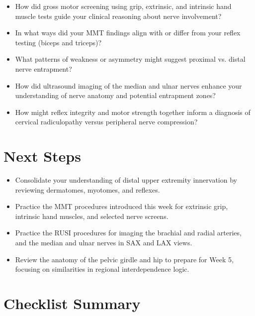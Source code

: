\begin{itemize}
  \item How did gross motor screening using grip, extrinsic, and intrinsic hand muscle tests guide your clinical reasoning about nerve involvement?
  \item In what ways did your MMT findings align with or differ from your reflex testing (biceps and triceps)?
  \item What patterns of weakness or asymmetry might suggest proximal vs. distal nerve entrapment?
  \item How did ultrasound imaging of the median and ulnar nerves enhance your understanding of nerve anatomy and potential entrapment zones?
  \item How might reflex integrity and motor strength together inform a diagnosis of cervical radiculopathy versus peripheral nerve compression?
\end{itemize}

\section*{Next Steps}

\begin{itemize}
  \item Consolidate your understanding of distal upper extremity innervation by reviewing dermatomes, myotomes, and reflexes.
  \item Practice the MMT procedures introduced this week for extrinsic grip, intrinsic hand muscles, and selected nerve screens.
  \item Practice the RUSI procedures for imaging the brachial and radial arteries, and the median and ulnar nerves in SAX and LAX views.
  \item Review the anatomy of the pelvic girdle and hip to prepare for Week 5, focusing on similarities in regional interdependence logic.
\end{itemize}

\section*{Checklist Summary}

